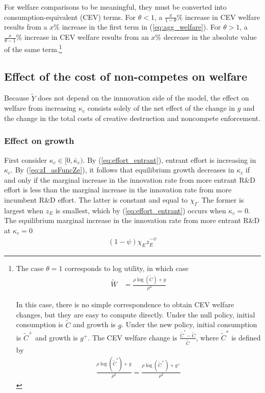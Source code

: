 \documentclass[12pt,english]{article}
\theoremstyle{remark}
\begin{document}
For welfare comparisons to be meaningful, they must be converted into consumption-equivalent (CEV) terms. For $\theta < 1$, a $\frac{x}{1-\theta}\%$ increase in CEV welfare results from a $x\%$ increase in the first term in (\ref{eq:agg_welfare}). For $\theta > 1$, a $\frac{x}{\theta-1}\%$ increase in CEV welfare results from an $x\%$ decrease in the absolute value of the same term.\footnote{The case $\theta = 1$ corresponds to log utility, in which case
	\begin{align}
	\tilde{W} &= \frac{\rho \log(\tilde{C}) + g}{\rho^2} \label{eq:agg_welfare_log}
	\end{align}
	
	In this case, there is no simple correspondence to obtain CEV welfare changes, but they are easy to compute directly. Under the null policy, initial consumption is $\tilde{C}$ and growth is $g$. Under the new policy, initial consumption is $\tilde{C}^+$ and growth is $g^+$. The CEV welfare change is $\frac{\tilde{C}^* - \tilde{C}}{\tilde{C}}$, where $\tilde{C}^*$ is defined by 
	\begin{align}
	\frac{\rho\log(\tilde{C}^*) + g}{\rho^2} = \frac{\rho \log(\tilde{C}^+) + g^+}{\rho^2} \label{eq:agg_welfare_log_CEV}
	\end{align}}

\subsection{Effect of the cost of non-competes on welfare}

Because $\tilde{Y}$ does not depend on the innnovation side of the model, the effect on welfare from increasing $\kappa_c$ consists solely of the net effect of the change in $g$ and the change in the total costs of creative destruction and noncompete enforcement.

\subsubsection{Effect on growth}

First consider $\kappa_c \in [0, \bar{\kappa}_c)$. By (\ref{eq:effort_entrant}), entrant effort is increasing in $\kappa_c$. By (\ref{eq:zI_asFuncZe}), it follows that equilibrium growth decreases in $\kappa_c$ if and only if the marginal increase in the innovation rate from more entrant R\&D effort is less than the marginal increase in the innovation rate from more incumbent R\&D effort. The latter is constant and equal to $\chi_I$. The former is largest when $z_E$ is smallest, which by (\ref{eq:effort_entrant}) occurs when $\kappa_c = 0$. The equilibrium marginal increase in the innovation rate from more entrant R\&D at $\kappa_c = 0$
\begin{align}
	(1-\psi) \chi_E z_E^{-\psi} 
\end{align}
\end{document}
